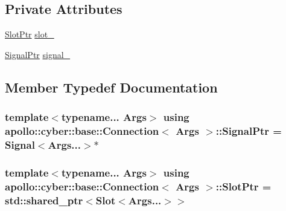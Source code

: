 \subsection*{Private Attributes}
\begin{DoxyCompactItemize}
\item 
\hyperlink{classapollo_1_1cyber_1_1base_1_1Connection_aaa42d1898c38f0d66f1a4883661846ed}{Slot\-Ptr} \hyperlink{classapollo_1_1cyber_1_1base_1_1Connection_a8b8a7dedee1d95437e5a957e54681f7d}{slot\-\_\-}
\item 
\hyperlink{classapollo_1_1cyber_1_1base_1_1Connection_a5ce878427399ecea970daa38c90b6de7}{Signal\-Ptr} \hyperlink{classapollo_1_1cyber_1_1base_1_1Connection_ab709b99980eb8f93424837336e66752f}{signal\-\_\-}
\end{DoxyCompactItemize}


\subsection{Member Typedef Documentation}
\hypertarget{classapollo_1_1cyber_1_1base_1_1Connection_a5ce878427399ecea970daa38c90b6de7}{
\subsubsection[{Signal\-Ptr}]{\setlength{\rightskip}{0pt plus 5cm}template$<$typename... Args$>$ using {\bf apollo\-::cyber\-::base\-::\-Connection}$<$ Args $>$\-::{\bf Signal\-Ptr} =  {\bf Signal}$<$Args...$>$$\ast$}}\label{classapollo_1_1cyber_1_1base_1_1Connection_a5ce878427399ecea970daa38c90b6de7}
\hypertarget{classapollo_1_1cyber_1_1base_1_1Connection_aaa42d1898c38f0d66f1a4883661846ed}{
\subsubsection[{Slot\-Ptr}]{\setlength{\rightskip}{0pt plus 5cm}template$<$typename... Args$>$ using {\bf apollo\-::cyber\-::base\-::\-Connection}$<$ Args $>$\-::{\bf Slot\-Ptr} =  std\-::shared\-\_\-ptr$<${\bf Slot}$<$Args...$>$$>$}}\label{classapollo_1_1cyber_1_1base_1_1Connection_aaa42d1898c38f0d66f1a4883661846ed}


